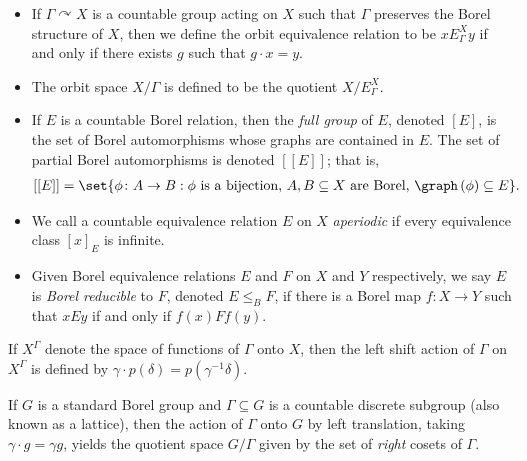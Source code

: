 \documentclass[10pt]{mypackage}
\begin{document}
\begin{definition}
\begin{itemize}
    \item If $\Gamma\curvearrowright X$ is a countable group acting on $X$ such that $\Gamma$ preserves the Borel structure of $X$, then we define the orbit equivalence relation to be $xE_{\Gamma}^X y$ if and only if there exists $g$ such that $g\cdot x = y$.
    \item The orbit space $X/\Gamma$ is defined to be the quotient $X/E_{\Gamma}^X$.
    \item If $E$ is a countable Borel relation, then the \textit{full group} of $E$, denoted $\left[ E \right]$, is the set of Borel automorphisms whose graphs are contained in $E$. The set of partial Borel automorphisms is denoted $\left[ \left[ E \right] \right]$; that is,
      \begin{align*}
        \left[ \left[ E \right] \right] &= \set{\phi\colon A\rightarrow B : \phi\text{ is a bijection, }A,B\subseteq X\text{ are Borel, }\graph\left( \phi \right)\subseteq E}.
      \end{align*}
    \item We call a countable equivalence relation $E$ on $X$ \textit{aperiodic} if every equivalence class $\left[ x \right]_E$ is infinite.
    \item Given Borel equivalence relations $E$ and $F$ on $X$ and $Y$ respectively, we say $E$ is \textit{Borel reducible} to $F$, denoted $E\leq_{B}F$, if there is a Borel map $f\colon X\rightarrow Y$ such that $xEy$ if and only if $f(x)Ff(y)$.
  \end{itemize}
\end{definition}
\begin{example}
  If $X^{\Gamma}$ denote the space of functions of $\Gamma$ onto $X$, then the left shift action of $\Gamma$ on $X^{\Gamma}$ is defined by $\gamma\cdot p\left( \delta \right) = p\left( \gamma^{-1}\delta \right)$.

  If $G$ is a standard Borel group and $\Gamma\subseteq G$ is a countable discrete subgroup (also known as a lattice), then the action of $\Gamma$ onto $G$ by left translation, taking $\gamma\cdot g = \gamma g$, yields the quotient space $G/\Gamma$ given by the set of \textit{right} cosets of $\Gamma$.
\end{example}
\end{document}
